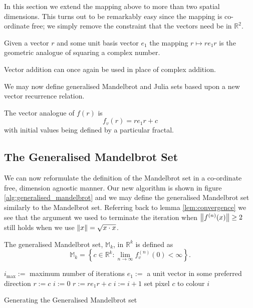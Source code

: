 In this section we extend the mapping above to more than two spatial dimensions.
This turns out to be remarkably easy since the mapping is co-ordinate free;
we simply remove the constraint that the vectors need be in $\mathbb{R}^2$.

\begin{definition}
Given a vector $r$ and some unit basis vector $e_1$ the mapping
$r \mapsto re_1r$ is the geometric analogue of squaring a complex number.
\end{definition}

Vector addition can once again be used in place of complex addition.


We may now define generalised Mandelbrot and Julia sets based upon
a new vector recurrence relation.

\begin{definition}\label{def:gen_f(r)}
The vector analogue of $f(r)$ is 
\[
f_v(r) = re_1r + c
\]
with initial values being defined by a particular fractal.
\end{definition}

\subsection{The Generalised Mandelbrot Set}

We can now reformulate the definition of the Mandelbrot set in a co-ordinate
free, dimension agnostic manner. Our new algorithm is shown in figure
\ref{alg:generalised_mandelbrot} and we may define the generalised
Mandelbrot set similarly to the Mandelbrot set. Referring back to lemma
\ref{lem:convergence} we see that the argument we used to terminate the iteration
when $\left\Vert f^{(n)}(x) \right\Vert \ge 2$ still holds when we use $\left\Vert x \right\Vert = \sqrt{x \cdot x}$.

\begin{definition}
The generalised Mandelbrot set, $\mathbb{M}_k$, in $\mathbb{R}^k$ 
    is defined as
\[
\mathbb{M}_k = 
\left\{c \in \mathbb{R}^k 
: \lim_{n \rightarrow \infty} f_v^{(n)}(0) < \infty \right\}.
\]
\end{definition}

\begin{fancyalg}
\begin{algorithmic}[1]
\STATE $i_{\mathrm{max}} :=$ maximum number of iterations
\STATE $e_1 :=$ a unit vector in some preferred direction
\STATE $r := c$
\STATE $i := 0$
  \STATE $r := re_1r + c$
  \STATE $i := i+1$
\ENDWHILE 
\STATE set pixel $c$ to colour $i$
\ENDFOR
\end{algorithmic}
\caption{
\label{alg:generalised_mandelbrot}
  Generating the Generalised Mandelbrot set}
\end{fancyalg}

